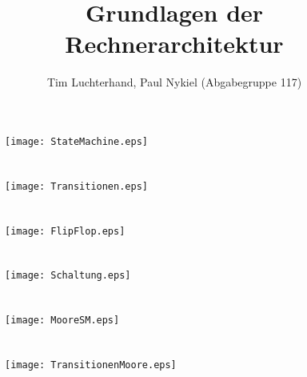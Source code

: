 \documentclass[DIN, pagenumber=false, fontsize=11pt, parskip=half]{scrartcl}
\title{Grundlagen der Rechnerarchitektur}
\author{Tim Luchterhand, Paul Nykiel (Abgabegruppe 117)}
\begin{document}
    \maketitle
    \section{}
    \begin{figure}[H]
        \centering
        \texttt{[image: StateMachine.eps]}
    \end{figure}

    \section{}
    \begin{figure}[H]
        \centering
        \texttt{[image: Transitionen.eps]}
    \end{figure}

    \section{}
    \begin{figure}[H]
        \centering
        \texttt{[image: FlipFlop.eps]}
    \end{figure}

    \section{}
    \begin{figure}[H]
        \centering
        \texttt{[image: Schaltung.eps]}
    \end{figure}

    \section{}
    \begin{figure}[H]
        \centering
        \texttt{[image: MooreSM.eps]}
    \end{figure}

    \section{}
    \begin{figure}[H]
        \centering
        \texttt{[image: TransitionenMoore.eps]}
    \end{figure}
\end{document}
